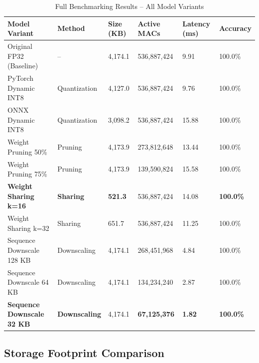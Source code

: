\documentclass[12pt,a4paper]{article}
\begin{document}
\begin{table}[h!]
\centering
\caption{Full Benchmarking Results -- All Model Variants}
\label{tab:main}
\renewcommand{\arraystretch}{1.4}
\begin{tabular}{L{3.6cm} C{1.8cm} R{1.8cm} R{1.8cm} R{1.8cm} C{1.8cm}}
\toprule
{}
\color{white}\textbf{Model Variant} &
\color{white}\textbf{Method} &
\color{white}\textbf{Size (KB)} &
\color{white}\textbf{Active MACs} &
\color{white}\textbf{Latency (ms)} &
\color{white}\textbf{Accuracy} \\
\midrule
Original FP32 (Baseline)      & --            & 4,174.1 & 536,887,424 &  9.91 & 100.0\% \\
PyTorch Dynamic INT8          & Quantization  & 4,127.0 & 536,887,424 &  9.76 & 100.0\% \\
ONNX Dynamic INT8             & Quantization  & 3,098.2 & 536,887,424 & 15.88 & 100.0\% \\
Weight Pruning 50\%           & Pruning       & 4,173.9 & 273,812,648 & 13.44 & 100.0\% \\
Weight Pruning 75\%           & Pruning       & 4,173.9 & 139,590,824 & 15.58 & 100.0\% \\
\textbf{Weight Sharing k=16}  & \textbf{Sharing}      & \textbf{521.3}  & 536,887,424 & 14.08 & \textbf{100.0\%} \\
Weight Sharing k=32           & Sharing       &   651.7 & 536,887,424 & 11.25 & 100.0\% \\
Sequence Downscale 128 KB     & Downscaling   & 4,174.1 & 268,451,968 &  4.84 & 100.0\% \\
Sequence Downscale 64 KB      & Downscaling   & 4,174.1 & 134,234,240 &  2.87 & 100.0\% \\
\textbf{Sequence Downscale 32 KB}  & \textbf{Downscaling} & 4,174.1 & \textbf{67,125,376} & \textbf{1.82} & \textbf{100.0\%} \\
\bottomrule
\end{tabular}
\end{table}

\subsection{Storage Footprint Comparison}
\end{document}
